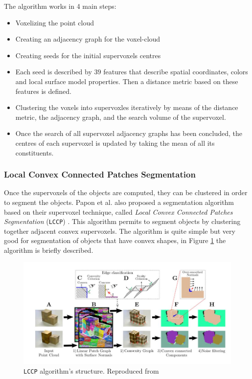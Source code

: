 The algorithm works in 4 main steps:
\begin{itemize}
\item Voxelizing the point cloud
\item Creating an adjacency graph for the voxel-cloud 
\item Creating seeds for the initial supervoxels centres
\item Each seed is described by $39$ features that describe spatial coordinates, colors and local surface model properties. Then a distance metric based on  these features is defined. 
\item Clustering the voxels into supervoxles iteratively by means of the distance metric, the adjacency graph, and the search volume of the supervoxel. 
\item Once the search of all supervoxel adjacency graphs has been concluded, the centres of each supervoxel is updated by taking the mean of all its constituents. 
\end{itemize} 

\subsubsection{Local Convex Connected Patches Segmentation}
\label{sec:LCCP}
Once the supervoxels of the objects are computed, they can be clustered in order to segment the objects. Papon et al. also proposed a segmentation algorithm based on their supervoxel technique, called \textit{Local Convex Connected Patches Segmentation} (\texttt{LCCP}) \citep{LCCP}. This algorithm permits to segment objects by clustering together adjacent convex supervoxels.  The algorithm is quite simple but very good for segmentation of objects that have convex shapes, in Figure \ref{img:LCCP_structure} the algorithm is briefly described. 

\begin{figure}[h]
\centering
\includegraphics[width=\textwidth]{Img/ObjectSegmentation/lccp_structure.jpg}
\caption{\texttt{LCCP} algorithm's structure. Reproduced from \citep{LCCP}}
\label{img:LCCP_structure}
\end{figure}


